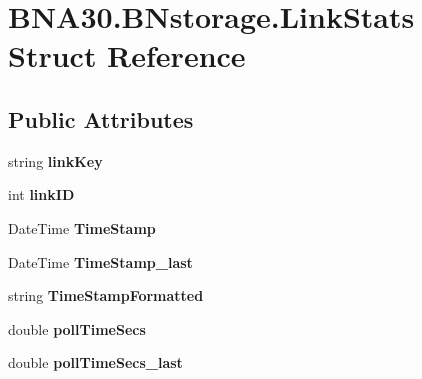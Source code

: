 \hypertarget{struct_b_n_a30_1_1_b_nstorage_1_1_link_stats}{}\section{B\+N\+A30.\+B\+Nstorage.\+Link\+Stats Struct Reference}
\label{struct_b_n_a30_1_1_b_nstorage_1_1_link_stats}
\subsection*{Public Attributes}
\begin{DoxyCompactItemize}
\item 
\mbox{\label{struct_b_n_a30_1_1_b_nstorage_1_1_link_stats_ae0290099789f28672b63ed478bb18fb2}} 
string {\bfseries link\+Key}
\item 
\mbox{\label{struct_b_n_a30_1_1_b_nstorage_1_1_link_stats_a9480e1cd2ede5be5f8e17a47c0103f68}} 
int {\bfseries link\+ID}
\item 
\mbox{\label{struct_b_n_a30_1_1_b_nstorage_1_1_link_stats_a05f86cab804ab1b777e7318628db6917}} 
Date\+Time {\bfseries Time\+Stamp}
\item 
\mbox{\label{struct_b_n_a30_1_1_b_nstorage_1_1_link_stats_a8c591ed22dee2810df95fcf20186e42c}} 
Date\+Time {\bfseries Time\+Stamp\+\_\+last}
\item 
\mbox{\label{struct_b_n_a30_1_1_b_nstorage_1_1_link_stats_ad0c47ce73bb143737d14cb8a74cbea51}} 
string {\bfseries Time\+Stamp\+Formatted}
\item 
\mbox{\label{struct_b_n_a30_1_1_b_nstorage_1_1_link_stats_ab22cd18857d43f4e6fbe8def791d2ccd}} 
double {\bfseries poll\+Time\+Secs}
\item 
\mbox{\label{struct_b_n_a30_1_1_b_nstorage_1_1_link_stats_a5a1434176e54aa53687fe52c4f6d1d2c}} 
double {\bfseries poll\+Time\+Secs\+\_\+last}
\item 

\end{DoxyCompactItemize}
